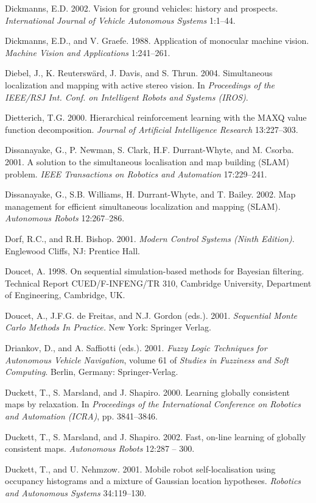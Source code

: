 \documentclass[10pt,a4paper]{article}
\begin{document}
Dickmanns, E.D. 2002. Vision for ground vehicles: history and prospects. \textit{International
Journal of Vehicle Autonomous Systems }1:1–44.

Dickmanns, E.D., and V. Graefe. 1988. Application of monocular machine vision.
\textit{Machine Vision and Applications} 1:241–261.

Diebel, J., K. Reuterswärd, J. Davis, and S. Thrun. 2004. Simultaneous localization
and mapping with active stereo vision. In \textit{Proceedings of the IEEE/RSJ Int. Conf. on
Intelligent Robots and Systems (IROS)}.

Dietterich, T.G. 2000. Hierarchical reinforcement learning with the MAXQ value
function decomposition. \textit{Journal of Artificial Intelligence Research} 13:227–303.

Dissanayake, G., P. Newman, S. Clark, H.F. Durrant-Whyte, and M. Csorba. 2001. A
solution to the simultaneous localisation and map building (SLAM) problem. \textit{IEEE
Transactions on Robotics and Automation} 17:229–241.

Dissanayake, G., S.B. Williams, H. Durrant-Whyte, and T. Bailey. 2002. Map management
for efficient simultaneous localization and mapping (SLAM). \textit{Autonomous
Robots} 12:267–286.

Dorf, R.C., and R.H. Bishop. 2001. \textit{Modern Control Systems (Ninth Edition)}. Englewood
Cliffs, NJ: Prentice Hall.

Doucet, A. 1998. On sequential simulation-based methods for Bayesian filtering.
Technical Report CUED/F-INFENG/TR 310, Cambridge University, Department
of Engineering, Cambridge, UK.

Doucet, A., J.F.G. de Freitas, and N.J. Gordon (eds.). 2001. \textit{Sequential Monte Carlo
Methods In Practice.} New York: Springer Verlag.

Driankov, D., and A. Saffiotti (eds.). 2001. \textit{Fuzzy Logic Techniques for Autonomous
Vehicle Navigation}, volume 61 of \textit{Studies in Fuzziness and Soft Computing}. Berlin,
Germany: Springer-Verlag.

Duckett, T., S. Marsland, and J. Shapiro. 2000. Learning globally consistent maps by
relaxation. In \textit{Proceedings of the International Conference on Robotics and Automation
(ICRA)}, pp. 3841–3846.

Duckett, T., S. Marsland, and J. Shapiro. 2002. Fast, on-line learning of globally
consistent maps. \textit{Autonomous Robots} 12:287 – 300.

Duckett, T., and U. Nehmzow. 2001. Mobile robot self-localisation using occupancy
histograms and a mixture of Gaussian location hypotheses. \textit{Robotics and
Autonomous Systems }34:119–130.
\end{document}
